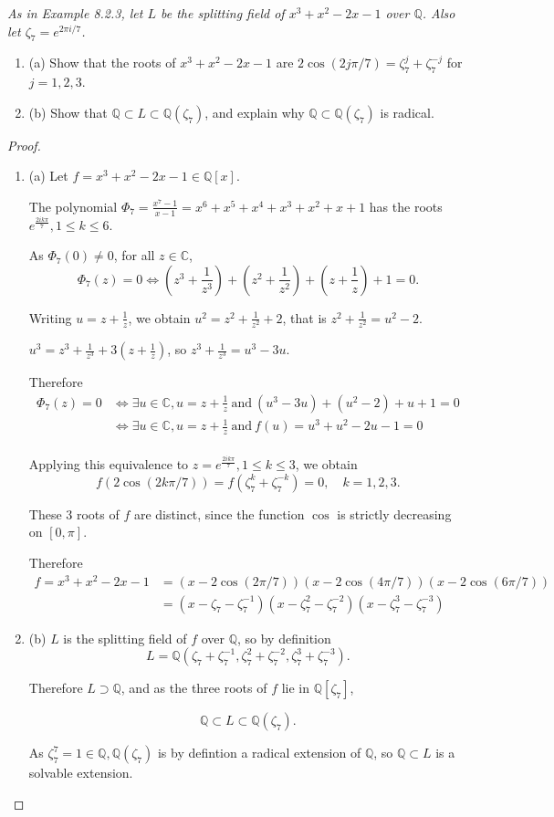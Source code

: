 \documentclass[11pt,a4paper]{article}
\newcommand{\be} {\begin{enumerate}}
\newcommand{\ee} {\end{enumerate}}
\newcommand{\Q}{\mathbb{Q}}
\begin{document}
{\it As in Example 8.2.3, let $L$ be the splitting field of $x^3+x^2-2x-1$ over $\Q$. Also let $\zeta_7 = e^{2\pi i/7}$.
\be
\item[(a)] Show that the roots of $x^3+x^2-2x-1$ are $2\cos(2j\pi/7) = \zeta_7^j + \zeta_7^{-j}$ for $j=1,2,3$.
\item[(b)] Show that $\Q \subset L \subset \Q(\zeta_7)$, and explain why $\Q \subset \Q(\zeta_7)$ is radical.
\ee
}

\begin{proof}
\be
\item[(a)] Let $f = x^3+x^2-2x-1\in \mathbb{Q}[x]$.

The polynomial $\Phi_7 = \frac{x^7-1}{x-1} = x^6+x^5+x^4+x^3+x^2+x+1$ has the roots $e^{\frac{2ik\pi}{7}}, {1 \leq k \leq 6}$.

As $\Phi_7(0) \neq  0$, for all $z \in \mathbb{C}$,
$$ \Phi_7(z) = 0 \iff \left(z^3 + \frac{1}{z^3}\right) + \left(z^2+\frac{1}{z^2}\right) + \left(z + \frac{1}{z}\right) +1 = 0.$$

Writing $u = z + \frac{1}{z}$, we obtain $u^2 = z^2+\frac{1}{z^2} + 2$, that is  $z^2+\frac{1}{z^2} = u^2-2$.

$u^3 = z^3 + \frac{1}{z^3} + 3(z + \frac{1}{z})$, so $z^3 + \frac{1}{z^3} = u^3 - 3u$.

Therefore
\begin{align*}
\Phi_7(z) = 0 &\iff \exists u \in \mathbb{C}, u =z + \frac{1}{z}\  \mathrm{and} \ (u^3 - 3u) + (u^2 - 2) +u+1 = 0\\
&\iff\exists u \in \mathbb{C}, u =z + \frac{1}{z}\  \mathrm{and} \ f(u)=u^3 + u^2 - 2u -1 = 0\\
\end{align*}

Applying this equivalence to $z = e^{\frac{2ik\pi}{7}}, 1 \leq k \leq 3$, we obtain $$f(2\cos(2k\pi/7))=f(\zeta_7^k + \zeta_7^{-k})=0,\quad  k = 1,2,3.$$

These 3 roots of $f$ are distinct, since the function $\cos$ is strictly decreasing on $[0,\pi]$.

Therefore 
\begin{align*}
f = x^3+x^2-2x-1 &= (x -2\cos(2\pi/7)) (x -2\cos(4\pi/7)) (x -2\cos(6\pi/7))\\
&= (x-\zeta_7-\zeta_7^{-1}) (x-\zeta_7^2-\zeta_7^{-2}) (x-\zeta_7^3-\zeta_7^{-3})
\end{align*}

\item[(b)] $L$ is the splitting field of $f$ over $\mathbb{Q}$, so by definition $$L = \mathbb{Q}(\zeta_7+\zeta_7^{-1},\zeta_7^2+\zeta_7^{-2},\zeta_7^3+\zeta_7^{-3}).$$

Therefore $L\supset \mathbb{Q}$, and as the three roots of $f$ lie in $\mathbb{Q}[\zeta_7]$,

$$\mathbb{Q} \subset L \subset \mathbb{Q}(\zeta_7).$$

As $\zeta_7^7 = 1 \in \mathbb{Q}, \mathbb{Q}(\zeta_7)$ is by defintion a radical extension of $\mathbb{Q}$, so $\Q \subset L$ is a solvable extension.
\ee
\end{proof}
\end{document}
